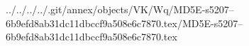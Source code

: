../../../../.git/annex/objects/VK/Wq/MD5E-s5207--6b9efd8ab31dc11dbccf9a508e6c7870.tex/MD5E-s5207--6b9efd8ab31dc11dbccf9a508e6c7870.tex